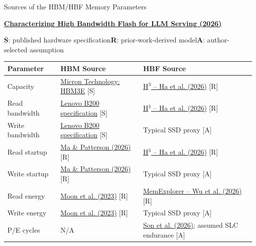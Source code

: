 \documentclass[aspectratio=169,10pt]{beamer}
\newcommand{\hbfurl}{https://arxiv.org/abs/2609.39131v2}
\begin{document}
\begin{frame}[t,label=MEMORYSOURCES]{Sources of the HBM/HBF Memory Parameters}
\relax
{\small\bfseries\color{Accent}\href{\hbfurl}{Characterizing High Bandwidth Flash for LLM Serving (2026)}\par}
\vspace{.08cm}
{\scriptsize\color{Muted}\textbf{S}: published hardware specification\quad\textbf{R}: prior-work-derived model\quad\textbf{A}: author-selected assumption\par}
\vspace{.08cm}
{\footnotesize\renewcommand{\arraystretch}{1.08}
\begin{tabularx}{\linewidth}{@{}p{2.6cm}p{4.0cm}X@{}}\toprule
\textbf{Parameter} & \textbf{HBM Source} & \textbf{HBF Source}\\\midrule
Capacity & \href{https://www.micron.com/products/memory/hbm/hbm3e}{Micron Technology: HBM3E} [S] & \href{https://doi.org/10.1109/LCA.2026.3660969}{H$^3$ -- Ha et al. (2026)} [R]\\
Read bandwidth & \href{https://lenovopress.lenovo.com/lp2226-thinksystem-nvidia-b200-180gb-1000w-gpu}{Lenovo B200 specification} [S] & \href{https://doi.org/10.1109/LCA.2026.3660969}{H$^3$ -- Ha et al. (2026)} [R]\\
Write bandwidth & \href{https://lenovopress.lenovo.com/lp2226-thinksystem-nvidia-b200-180gb-1000w-gpu}{Lenovo B200 specification} [S] & Typical SSD proxy [A]\\
Read startup & \href{https://doi.org/10.1109/MC.2026.3652916}{Ma \& Patterson (2026)} [R] & \href{https://doi.org/10.1109/LCA.2026.3660969}{H$^3$ -- Ha et al. (2026)} [R]\\
Write startup & \href{https://doi.org/10.1109/MC.2026.3652916}{Ma \& Patterson (2026)} [R] & Typical SSD proxy [A]\\
\rowcolor{SoftMint}Read energy & \href{https://doi.org/10.1109/IEDM45741.2023.10413890}{Moon et al. (2023)} [R] & \href{https://arxiv.org/abs/2604.16007v1}{MemExplorer -- Wu et al. (2026)} [R]\\
\rowcolor{SoftLilac}Write energy & \href{https://doi.org/10.1109/IEDM45741.2023.10413890}{Moon et al. (2023)} [R] & Typical SSD proxy [A]\\
P/E cycles & N/A & \href{https://doi.org/10.1109/LCA.2026.3705817}{Son et al. (2026)}; assumed SLC endurance [A]\\\bottomrule
\end{tabularx}\par}
\vspace{.08cm}

\end{frame}
\end{document}
